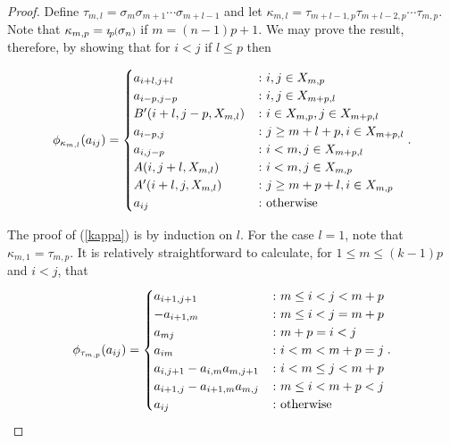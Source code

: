 \documentclass[11pt]{amsart}
\def\s{{\sigma}}
\def\t{{\tau}}
\newcommand*{\smallp}[1]{\scalebox{.75}{\ensuremath#1}}
\newcommand{\pp}[2][p]{\imath_{\hspace*{-1pt}#1}\hspace*{-.5pt}\smallp(#2\smallp)}
\theoremstyle{definition}
\begin{document}
\begin{proof}
Define $\t_{m,l} = \s_m\s_{m+1}\cdots\s_{m+l-1}$ and let $\kappa_{m,l} = \t_{m+l-1,p}\t_{m+l-2,p}\cdots\t_{m,p}$. Note that $\kappa_{m,p}=\pp{\s_n}$ if $m=(n-1)p+1$. We may prove the result, therefore, by showing that for $i<j$ if $l\le p$ then

\begin{equation}\label{kappa}
\phi_{\kappa_{m,l}}(a_{ij}) =
  \begin{cases}
       a_{i+l,j+l} &\colon i,j\in X_{m,p}\\
       a_{i-p,j-p} & \colon i,j\in X_{m+p,l}\\
       B'(i+l,j-p,X_{m,l}) & \colon i\in X_{m,p}, j\in X_{m+p,l}\\
       a_{i-p,j} &\colon j\ge m+l+p, i\in X_{m+p,l}\\
       a_{i,j-p} & \colon i<m, j\in X_{m+p,l}\\
       A(i,j+l,X_{m,l}) & \colon i<m, j\in X_{m,p}\\
       A'(i+l,j,X_{m,l}) & \colon j\ge m+p+l, i\in X_{m,p}\\
       a_{ij} & \colon \textnormal{otherwise}
  \end{cases}.
\end{equation}

The proof of (\ref{kappa}) is by induction on $l$. For the case $l=1$, note that $\kappa_{m,1}=\t_{m,p}$. It is relatively straightforward to calculate, for $1\le m \le (k-1)p$ and $i<j$, that
\begin{equation}\label{tau}
\phi_{\t_{m,p}}(a_{ij}) =
  \begin{cases}
       a_{i+1,j+1} & \colon m\le i<j< m+p\\
       -a_{i+1,m} & \colon m\le i < j = m+p\\
       a_{mj} & \colon m+p=i<j\\
       a_{im} & \colon i<m<m+p=j\\
       a_{i,j+1}-a_{i,m}a_{m,j+1} & \colon i<m\le j< m+p\\
       a_{i+1,j}-a_{i+1,m}a_{m,j} & \colon m\le i< m+p<j\\
       a_{ij} & \colon \textnormal{otherwise}
  \end{cases}.
\end{equation}


\end{proof}
\end{document}
